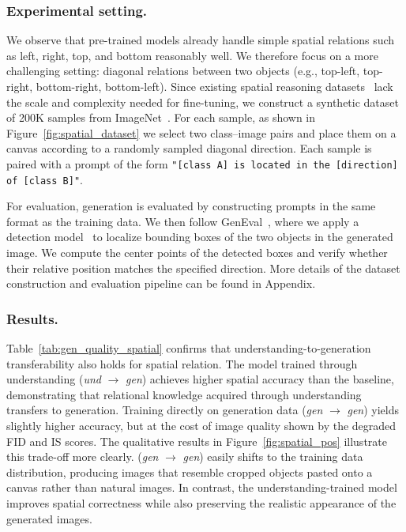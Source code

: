 


\subsubsection{Experimental setting.} We observe that pre-trained models already handle simple spatial relations such as left, right, top, and bottom reasonably well. We therefore focus on a more challenging setting: diagonal relations between two objects (e.g., top-left, top-right, bottom-right, bottom-left). Since existing spatial reasoning datasets~\cite{hudson2019gqa, zhang2021vsr} lack the scale and complexity needed for fine-tuning, we construct a synthetic dataset of 200K samples from ImageNet~\cite{deng2009imagenet}. For each sample, as shown in Figure~\ref{fig:spatial_dataset} we select two class–image pairs and place them on a canvas according to a randomly sampled diagonal direction. Each sample is paired with a prompt of the form \texttt{"[class A] is located in the [direction] of [class B]"}.


For evaluation, generation is evaluated by constructing prompts in the same format as the training data. We then follow GenEval~\cite{ghosh2023geneval}, where we apply a detection model~\cite{cheng2022masked} to localize bounding boxes of the two objects in the generated image. We compute the center points of the detected boxes and verify whether their relative position matches the specified direction. More details of the dataset construction and evaluation pipeline can be found in Appendix.

\subsubsection{Results.}
Table~\ref{tab:gen_quality_spatial} confirms that understanding-to-generation transferability also holds for spatial relation. The model trained through understanding (\textit{und} $\rightarrow$ \textit{gen}) achieves higher spatial accuracy than the baseline, demonstrating that relational knowledge acquired through understanding transfers to generation. Training directly on generation data (\textit{gen} $\rightarrow$ \textit{gen}) yields slightly higher accuracy, but at the cost of image quality shown by the degraded FID and IS scores. The qualitative results in Figure~\ref{fig:spatial_pos} illustrate this trade-off more clearly. (\textit{gen} $\rightarrow$ \textit{gen}) easily shifts to the training data distribution, producing images that resemble cropped objects pasted onto a canvas rather than natural images. In contrast, the understanding-trained model improves spatial correctness while also preserving the realistic appearance of the generated images.

